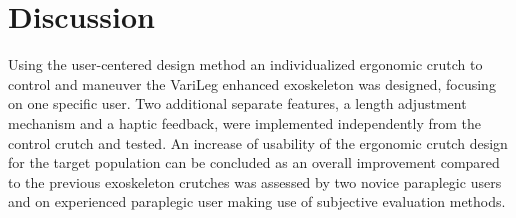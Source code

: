 \documentclass[conference,a4paper]{IEEEtran}
\begin{document}
\section{Discussion}
Using the user-centered design method an individualized ergonomic crutch to control and maneuver the VariLeg enhanced exoskeleton was designed, focusing on one specific user. Two additional separate features, a length adjustment mechanism and a haptic feedback, were implemented independently from the control crutch and tested. An increase of usability of the ergonomic crutch design for the target population can be concluded as an overall improvement compared to the previous exoskeleton crutches was assessed by two novice paraplegic users and on experienced paraplegic user making use of subjective evaluation methods.


\end{document}
